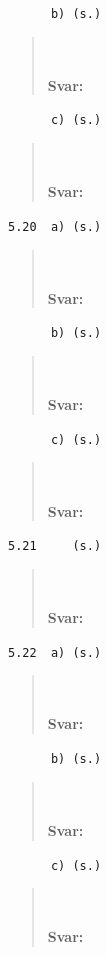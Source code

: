 \documentclass[a4paper]{article}
\newcommand{\tskcol}[1]{\textcolor{tskcol}{#1}}
\begin{document}
	\texttt{\tskcol{~~~~~~b) (s.)}}
	\begin{quotation}
		\noindent
		\\ \\
		\textbf{Svar:}
	\end{quotation}
	
	\texttt{\tskcol{~~~~~~c) (s.)}}
	\begin{quotation}
		\noindent
		\\ \\
		\textbf{Svar:}
	\end{quotation}
	
	\texttt{\tskcol{5.20~~a) (s.)}}
	\begin{quotation}
		\noindent
		\\ \\
		\textbf{Svar:}
	\end{quotation}
	
	\texttt{\tskcol{~~~~~~b) (s.)}}
	\begin{quotation}
		\noindent
		\\ \\
		\textbf{Svar:}
	\end{quotation}
	
	\texttt{\tskcol{~~~~~~c) (s.)}}
	\begin{quotation}
		\noindent
		\\ \\
		\textbf{Svar:}
	\end{quotation}
	
	\texttt{\tskcol{5.21~~~~ (s.)}}
	\begin{quotation}
		\noindent
		\\ \\
		\textbf{Svar:}
	\end{quotation}
	
	\texttt{\tskcol{5.22~~a) (s.)}}
	\begin{quotation}
		\noindent
		\\ \\
		\textbf{Svar:}
	\end{quotation}
	
	\texttt{\tskcol{~~~~~~b) (s.)}}
	\begin{quotation}
		\noindent
		\\ \\
		\textbf{Svar:}
	\end{quotation}
	
	\texttt{\tskcol{~~~~~~c) (s.)}}
	\begin{quotation}
		\noindent
		\\ \\
		\textbf{Svar:}
	\end{quotation}
	
\end{document}
